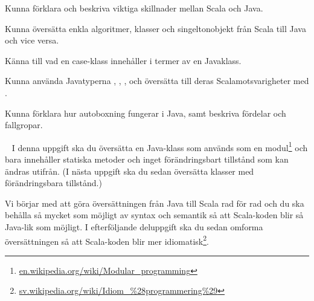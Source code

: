 

\ifPreSolution



\Exercise{\ExeWeekELEVEN}\label{exe:W11}

\begin{Goals}
\item Kunna förklara och beskriva viktiga skillnader mellan Scala och Java.
\item Kunna översätta enkla algoritmer, klasser och singeltonobjekt från Scala till Java och vice versa.
\item Känna till vad en case-klass innehåller i termer av en Javaklass.
\item Kunna använda Javatyperna , , ,  och översätta till deras Scalamotsvarigheter med .
\item Kunna förklara hur autoboxning fungerar i Java, samt beskriva fördelar och fallgropar.
\end{Goals}

\begin{Preparations}
\item {}
\end{Preparations}

\BasicTasks %

\else



\ExerciseSolution{\ExeWeekELEVEN}

\BasicTasks %

\fi






\QUESTBEGIN

\Task  \what~  I denna uppgift ska du översätta en Java-klass som används som en modul\footnote{\href{https://en.wikipedia.org/wiki/Modular_programming}{en.wikipedia.org/wiki/Modular\_programming}} och bara innehåller statiska metoder och inget förändringsbart tillstånd som kan ändras utifrån. (I nästa uppgift ska du sedan översätta klasser med förändringsbara  tillstånd.)

Vi börjar med att göra översättningen från Java till Scala rad för rad och du ska behålla så mycket som möjligt av syntax och semantik så att Scala-koden blir så Java-lik som möjligt. I efterföljande deluppgift ska du sedan omforma översättningen så att Scala-koden blir mer idiomatisk\footnote{\href{https://sv.wikipedia.org/wiki/Idiom_\%28programmering\%29}{sv.wikipedia.org/wiki/Idiom\_\%28programmering\%29}}.

